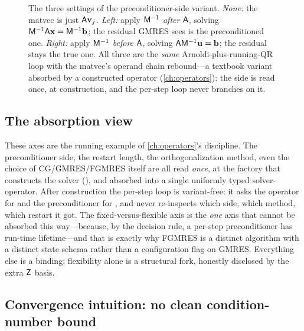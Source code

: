 \begin{figure}[t]
\caption[The preconditioner-side axis]{The three settings of the preconditioner-side
variant. \emph{None:} the matvec is just $\mathsf{A}\mathbf{v}_j$. \emph{Left:} apply
$\mathsf{M}^{-1}$ \emph{after} $\mathsf{A}$, solving $\mathsf{M}^{-1}\mathsf{A}\mathbf{x}=\mathsf{M}^{-1}\mathbf{b}$;
the residual GMRES sees is the preconditioned one. \emph{Right:} apply $\mathsf{M}^{-1}$
\emph{before} $\mathsf{A}$, solving $\mathsf{A}\mathsf{M}^{-1}\mathbf{u}=\mathbf{b}$; the residual stays the
true one. All three are the \emph{same} Arnoldi-plus-running-QR loop with the matvec's
operand chain rebound---a textbook variant absorbed by a constructed operator
(\cref{ch:operators}): the side is read once, at construction, and the per-step loop
never branches on it.}
\label{fig:precondside}
\end{figure}

\subsection{The absorption view}

These axes are the running example of \cref{ch:operators}'s discipline. The
preconditioner side, the restart length, the orthogonalization method, even the
choice of CG/GMRES/FGMRES itself are all read \emph{once}, at the factory that
constructs the solver (), and absorbed into a single
uniformly typed solver-operator. After construction the per-step loop is
variant-free: it asks the operator for  and the preconditioner for
, and never re-inspects which side, which method, which restart it
got. The fixed-versus-flexible axis is the \emph{one} axis that cannot be absorbed
this way---because, by the decision rule, a per-step preconditioner has run-time
lifetime---and that is exactly why FGMRES is a distinct algorithm with a distinct
state schema rather than a configuration flag on GMRES. Everything else is a binding;
flexibility alone is a structural fork, honestly disclosed by the extra $\mathsf{Z}$
basis.

\subsection{Convergence intuition: no clean condition-number bound}

